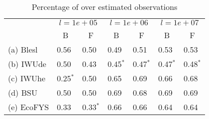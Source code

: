 \begin{table}[htb]
\centering
\caption{Percentage of over estimated observations}
\label{tab:diffOver}
\begin{tabular}{l ll ll ll}
\toprule
 & \multicolumn{2}{c}{$l = 1e+05$}
 & \multicolumn{2}{c}{$l = 1e+06$}
 & \multicolumn{2}{c}{$l = 1e+07$}
   \\
 & \multicolumn{1}{c}{B} & \multicolumn{1}{c}{F} & 
   \multicolumn{1}{c}{B} & \multicolumn{1}{c}{F} & 
   \multicolumn{1}{c}{B} & \multicolumn{1}{c}{F} \\
\midrule

(a) Blesl &0.56     &0.50     &0.49     &0.51     &0.53     &0.53 \\
(b) IWUde &0.50     &0.43     &0.45$^*$ &0.47$^*$ &0.47$^*$ &0.48$^*$ \\
(c) IWUhe &0.25$^*$ &0.50     &0.65     &0.69     &0.66     &0.68 \\
(d) BSU   &0.50     &0.50     &0.69     &0.68     &0.69     &0.69 \\
(e) EcoFYS&0.33     &0.33$^*$ &0.66     &0.66     &0.64     &0.64 \\

\bottomrule
\end{tabular}
\end{table}

